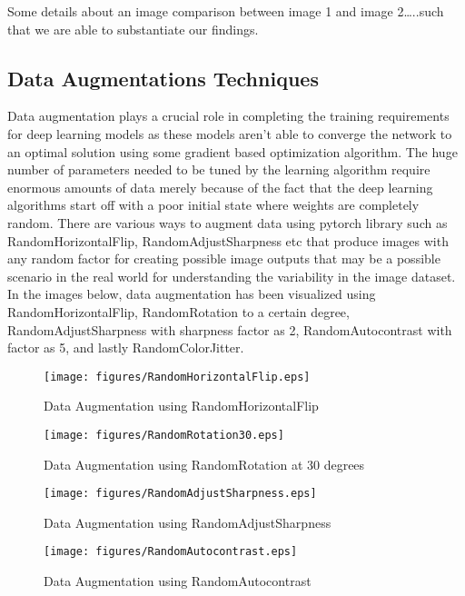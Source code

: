 \documentclass[conference]{IEEEtran}
\begin{document}
Some details about an image comparison between image 1 and image 2…..such that we are able to substantiate our findings.

\subsection{Data Augmentations Techniques}
Data augmentation plays a crucial role in completing the training requirements for deep learning models as these models aren’t able to converge the network to an optimal solution using some gradient based optimization algorithm. The huge number of parameters needed to be tuned by the learning algorithm require enormous amounts of data merely because of the fact that the deep learning algorithms start off with a poor initial state where weights are completely random. There are various ways to augment data using pytorch library such as RandomHorizontalFlip, RandomAdjustSharpness etc that produce images with any random factor for creating possible image outputs that may be a possible scenario in the real world for understanding the variability in the image dataset. 
In the images below, data augmentation has been visualized using RandomHorizontalFlip, RandomRotation to a certain degree, RandomAdjustSharpness with sharpness factor as 2,  RandomAutocontrast with factor as 5, and lastly RandomColorJitter.

\begin{figure}[htbp] 
    \texttt{[image: figures/RandomHorizontalFlip.eps]} 
    \caption{Data Augmentation using RandomHorizontalFlip} 
    \label{fig} 
    \end{figure}

\begin{figure}[htbp] 
    \texttt{[image: figures/RandomRotation30.eps]} 
    \caption{Data Augmentation using RandomRotation at 30 degrees} 
    \label{fig} 
    \end{figure}

\begin{figure}[htbp] 
    \texttt{[image: figures/RandomAdjustSharpness.eps]} 
    \caption{Data Augmentation using RandomAdjustSharpness} 
    \label{fig} 
    \end{figure}

\begin{figure}[htbp] 
    \texttt{[image: figures/RandomAutocontrast.eps]} 
    \caption{Data Augmentation using RandomAutocontrast} 
    \label{fig} 
    \end{figure}
\end{document}

